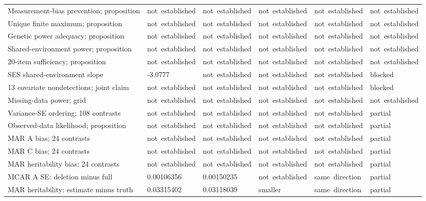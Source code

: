 \documentclass[11pt]{article}
\begin{document}
{\begin{tabular}{@{}p{156pt}p{57pt}p{57pt}p{74pt}p{62pt}p{57pt}@{}}
Measurement-bias prevention; proposition & \mbox{not established} & \mbox{not established} & \mbox{not established} & \mbox{not established} & \mbox{not established}\\
Unique finite maximum; proposition & \mbox{not established} & \mbox{not established} & \mbox{not established} & \mbox{not established} & \mbox{not established}\\
Genetic power adequacy; proposition & \mbox{not established} & \mbox{not established} & \mbox{not established} & \mbox{not established} & \mbox{not established}\\
Shared-environment power; proposition & \mbox{not established} & \mbox{not established} & \mbox{not established} & \mbox{not established} & \mbox{not established}\\
20-item sufficiency; proposition & \mbox{not established} & \mbox{not established} & \mbox{not established} & \mbox{not established} & \mbox{not established}\\
SES shared-environment slope & -3.0777 & \mbox{not established} & \mbox{not established} & \mbox{not established} & blocked\\
13 covariate nondetections; joint claim & \mbox{not established} & \mbox{not established} & \mbox{not established} & \mbox{not established} & blocked\\
Missing-data power; grid & \mbox{not established} & \mbox{not established} & \mbox{not established} & \mbox{not established} & \mbox{not established}\\
Variance-SE ordering; 108 contrasts & \mbox{not established} & \mbox{not established} & \mbox{not established} & \mbox{not established} & partial\\
Observed-data likelihood; proposition & \mbox{not established} & \mbox{not established} & \mbox{not established} & \mbox{not established} & partial\\
MAR A bias; 24 contrasts & \mbox{not established} & \mbox{not established} & \mbox{not established} & \mbox{not established} & partial\\
MAR C bias; 24 contrasts & \mbox{not established} & \mbox{not established} & \mbox{not established} & \mbox{not established} & partial\\
MAR heritability bias; 24 contrasts & \mbox{not established} & \mbox{not established} & \mbox{not established} & \mbox{not established} & partial\\
MCAR A SE: deletion minus full & 0.00106356 & 0.00150235 & \mbox{not established} & \mbox{same direction} & partial\\
MAR heritability: estimate minus truth & 0.03315402 & 0.03118039 & smaller & \mbox{same direction} & partial\\
\bottomrule\end{tabular}

}
\end{document}
